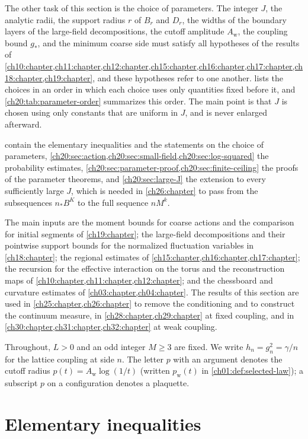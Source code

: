 The other task of this section is the choice of parameters. The integer $J$, the analytic radii, the support radius $r$ of $B_r$ and $D_r$, the widths of the boundary layers of the large-field decompositions, the cutoff amplitude $A_{\mathrm w}$, the coupling bound $g_*$, and the minimum coarse side must satisfy all hypotheses of the results of \cref{ch10:chapter,ch11:chapter,ch12:chapter,ch15:chapter,ch16:chapter,ch17:chapter,ch18:chapter,ch19:chapter}, and these hypotheses refer to one another.  lists the choices in an order in which each choice uses only quantities fixed before it, and \cref{ch20:tab:parameter-order} summarizes this order. The main point is that $J$ is chosen using only constants that are uniform in $J$, and is never enlarged afterward.

 contain the elementary inequalities and the statements on the choice of parameters, \cref{ch20:sec:action,ch20:sec:small-field,ch20:sec:log-squared} the probability estimates, \cref{ch20:sec:parameter-proof,ch20:sec:finite-ceiling} the proofs of the parameter theorems, and \cref{ch20:sec:large-J} the extension to every sufficiently large $J$, which is needed in \cref{ch26:chapter} to pass from the subsequences $n_*B^K$ to the full sequence $nM^k$.

The main inputs are the moment bounds for coarse actions and the comparison for initial segments of \cref{ch19:chapter}; the large-field decompositions and their pointwise support bounds for the normalized fluctuation variables in \cref{ch18:chapter}; the regional estimates of \cref{ch15:chapter,ch16:chapter,ch17:chapter}; the recursion for the effective interaction on the torus and the reconstruction maps of \cref{ch10:chapter,ch11:chapter,ch12:chapter}; and the chessboard and curvature estimates of \cref{ch03:chapter,ch04:chapter}. The results of this section are used in \cref{ch25:chapter,ch26:chapter} to remove the conditioning and to construct the continuum measure, in \cref{ch28:chapter,ch29:chapter} at fixed coupling, and in \cref{ch30:chapter,ch31:chapter,ch32:chapter} at weak coupling.

Throughout, $L>0$ and an odd integer $M\ge3$ are fixed. We write $h_n=g_n^2=\gamma/n$ for the lattice coupling at side $n$. The letter $p$ with an argument denotes the cutoff radius $p(t)=A_{\mathrm w}\log(1/t)$ (written $p_{\mathrm w}(t)$ in \cref{ch01:def:selected-law}); a subscript $p$ on a configuration denotes a plaquette.

\section{Elementary inequalities}\label{ch20:sec:elementary}

